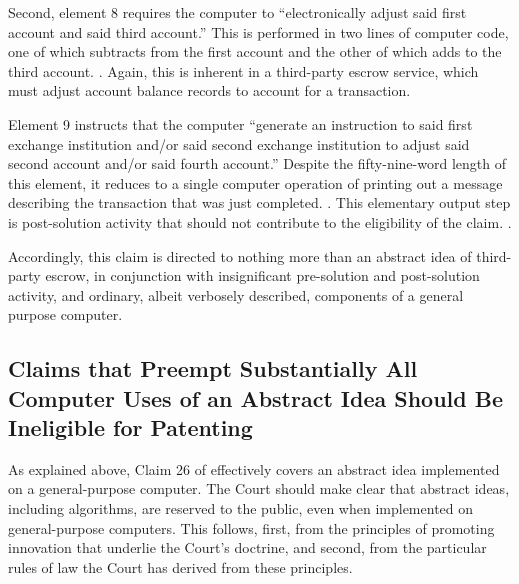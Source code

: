 \documentclass{scotus}
\begin{document}
Second, element 8 requires the computer to ``electronically adjust said first
account and said third account.'' This is performed in two lines of computer
code, one of which subtracts from the first account and the other of which adds
to the third account. . Again, this
is inherent in a third-party escrow service, which must adjust account balance
records to account for a transaction.

Element 9 instructs that the computer ``generate an instruction to said first
exchange institution and/or said second exchange institution to adjust said
second account and/or said fourth account.'' Despite the fifty-nine-word length
of this element, it reduces to a single computer operation of printing out a
message describing the transaction that was just completed. . This elementary output step is post-solution activity
that should not contribute to the eligibility of the claim. .

Accordingly, this claim is directed to nothing more than an abstract idea of
third-party escrow, in conjunction with insignificant pre-solution and
post-solution activity, and ordinary, albeit verbosely described, components of
a general purpose computer.



%
%
\subsection{Claims that Preempt Substantially All Computer Uses of an Abstract
Idea Should Be Ineligible for Patenting}

\iffalse
A patent claim with the ``practical effect'' of removing an abstract idea from
the public domain is ineligible under \inline{101}. \sentence{see benson at
71-72}.
Claim 26 of the '375 patent would have the practical effect of removing all uses
of an abstract idea \emph{implemented on a general-purpose computer} from the
public domain.
\fi

As explained above, Claim 26 of  effectively covers an abstract
idea implemented on a general-purpose computer.
The Court should make clear that abstract ideas, including
algorithms, are reserved to the public, even when implemented on general-purpose
computers.
This follows, first, from the principles of promoting innovation that underlie
the Court's  doctrine, and second, from the particular rules of law
the Court has derived from these principles.
\end{document}
